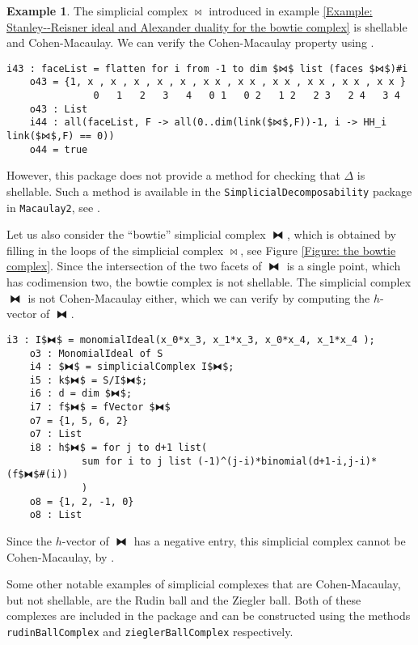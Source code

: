 \documentclass[12pt,leqno]{amsart}
\theoremstyle{definition}
\newtheorem{example}[lemma]{Example}
\begin{document}
\begin{example}
  \label{Example: Shellability, the Cohen-Macaulay property, and the h-vector}
  The simplicial complex $\bowtie$ introduced in example
  \ref{Example: Stanley--Reisner ideal and Alexander duality for the bowtie complex}
  is shellable and Cohen-Macaulay. We can verify the Cohen-Macaulay property
  using \cite[Corollary 5.3.9]{BH}.
\begin{lstlisting}[basicstyle={\ttfamily \scriptsize}, xleftmargin=-23pt]
    i43 : faceList = flatten for i from -1 to dim $⋈$ list (faces $⋈$)#i
    o43 = {1, x , x , x , x , x , x x , x x , x x , x x , x x , x x }
               0   1   2   3   4   0 1   0 2   1 2   2 3   2 4   3 4
    o43 : List
    i44 : all(faceList, F -> all(0..dim(link($⋈$,F))-1, i -> HH_i link($⋈$,F) == 0))
    o44 = true
\end{lstlisting}
  However, this package does not provide a method for checking that $\Delta$
  is shellable. Such a method is available in the
  \texttt{SimplicialDecomposability} package in \texttt{Macaulay2}, see
  \cite{Cook}.

  Let us also consider the ``bowtie'' simplicial complex $\fbowtie$, which is
  obtained by filling in the loops of the simplicial complex $\bowtie$, see
  Figure \ref{Figure: the bowtie complex}. Since the intersection of the two
  facets of $\fbowtie$ is a single point, which has codimension two, the
  bowtie complex is not shellable. The simplicial complex $\fbowtie$ is not
  Cohen-Macaulay either, which we can verify by computing the $h$-vector of
  $\fbowtie$.
\begin{lstlisting}[basicstyle={\ttfamily \scriptsize}, xleftmargin=-23pt]
    i3 : I$⧓$ = monomialIdeal(x_0*x_3, x_1*x_3, x_0*x_4, x_1*x_4 );
    o3 : MonomialIdeal of S
    i4 : $⧓$ = simplicialComplex I$⧓$;
    i5 : k$⧓$ = S/I$⧓$;
    i6 : d = dim $⧓$;
    i7 : f$⧓$ = fVector $⧓$
    o7 = {1, 5, 6, 2}
    o7 : List
    i8 : h$⧓$ = for j to d+1 list(
             sum for i to j list (-1)^(j-i)*binomial(d+1-i,j-i)*(f$⧓$#(i))
             )
    o8 = {1, 2, -1, 0}
    o8 : List
\end{lstlisting}
  Since the $h$-vector of $\fbowtie$ has a negative entry, this simplicial
  complex cannot be Cohen-Macaulay, by \cite[Lemma~5.1.10]{BH}.
\end{example}

Some other notable examples of simplicial complexes that are Cohen-Macaulay,
but not shellable, are the Rudin ball and the Ziegler ball. Both of these
complexes are included in the package and can be constructed using the methods
\texttt{rudinBallComplex} and \texttt{zieglerBallComplex} respectively.
\end{document}
